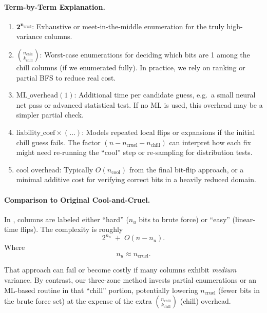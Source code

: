 \documentclass[conference]{IEEEtran}
\begin{document}
\paragraph{Term-by-Term Explanation.}
\begin{enumerate}
  \item \(\mathbf{2^{n_{\mathrm{cruel}}}}\): 
  Exhaustive or meet-in-the-middle enumeration for the truly high-variance columns.

  \item \(\binom{n_{\mathrm{chill}}}{k_{\mathrm{chill}}}\):
  Worst-case enumerations for deciding which bits are 1 among the chill columns (if we enumerated fully). In practice, we rely on ranking or partial BFS to reduce real cost.

  \item \(\mathrm{ML\_overhead}(1)\):
  Additional time per candidate guess, e.g.\ a small neural net pass or advanced statistical test. 
  If no ML is used, this overhead may be a simpler partial check.

  \item \(\mathrm{liability\_coef}\times(\dots)\):
  Models repeated local flips or expansions if the initial chill guess fails. The factor \((n - n_{\mathrm{cruel}} - n_{\mathrm{chill}})\) can interpret how each fix might need re-running the “cool” step or re-sampling for distribution tests.

  \item \(\text{cool overhead}\):
  Typically $O(n_{\mathrm{cool}})$ from the final bit-flip approach, or a minimal additive cost for verifying correct bits in a heavily reduced domain.
\end{enumerate}

\paragraph{Comparison to Original Cool-and-Cruel.}
In \cite{cool-and-cruel}, columns are labeled either ``hard'' ($n_u$ bits to brute force) or ``easy'' (linear-time flips). The complexity is roughly
\[
  2^{n_{u}} \;+\; O(n - n_u).
\]
Where \[
n_u \approx n_{\mathrm{cruel}}.
\]

That approach can fail or become costly if many columns exhibit \emph{medium} variance. By contrast, our three-zone method invests partial enumerations or an ML-based routine in that “chill” portion, potentially lowering $n_{\mathrm{cruel}}$ (fewer bits in the brute force set) at the expense of the extra $\binom{n_{\mathrm{chill}}}{k_{\mathrm{chill}}}$ (chill) overhead.
\end{document}
